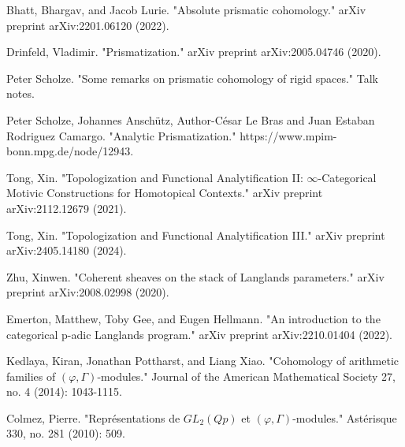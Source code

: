 \documentclass[12pt]{article}
\theoremstyle{definition}
\begin{document}
\begin{thebibliography}{}
 Bhatt, Bhargav, and Jacob Lurie. "Absolute prismatic cohomology." arXiv preprint arXiv:2201.06120 (2022).

 Drinfeld, Vladimir. "Prismatization." arXiv preprint arXiv:2005.04746 (2020).

 Peter Scholze. "Some remarks on prismatic cohomology of rigid spaces." Talk notes.

 Peter Scholze, Johannes Ansch\"utz, Author-C\'esar Le Bras and Juan Estaban Rodriguez Camargo. "Analytic Prismatization." https://www.mpim-bonn.mpg.de/node/12943.

 Tong, Xin. "Topologization and Functional Analytification II: $\infty $-Categorical Motivic Constructions for Homotopical Contexts." arXiv preprint arXiv:2112.12679 (2021).

 Tong, Xin. "Topologization and Functional Analytification III." arXiv preprint arXiv:2405.14180 (2024).

 Zhu, Xinwen. "Coherent sheaves on the stack of Langlands parameters." arXiv preprint arXiv:2008.02998 (2020). 

 Emerton, Matthew, Toby Gee, and Eugen Hellmann. "An introduction to the categorical p-adic Langlands program." arXiv preprint arXiv:2210.01404 (2022).

 Kedlaya, Kiran, Jonathan Pottharst, and Liang Xiao. "Cohomology of arithmetic families of $(\varphi, \Gamma)$-modules." Journal of the American Mathematical Society 27, no. 4 (2014): 1043-1115.

 Colmez, Pierre. "Repr\'esentations de $GL_2(Qp)$ et $(\varphi, \Gamma)$-modules." Ast\'erisque 330, no. 281 (2010): 509.

\end{thebibliography}
\end{document}

